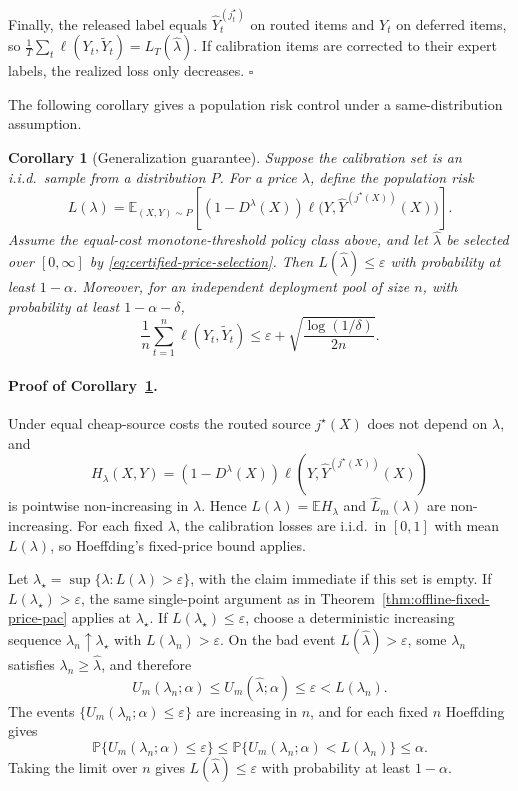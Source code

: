 \documentclass[11pt]{article}
\newtheorem{corollary}{Corollary}
\newcommand{\E}{\mathbb{E}}
\newcommand{\Pp}{\mathbb{P}}
\newcommand{\hatY}{\widehat Y}
\newcommand{\tildeY}{\widetilde Y}
\newcommand{\hatL}{\widehat L}
\newcommand{\eps}{\varepsilon}
\begin{document}
Finally, the released label equals \(\hatY_t^{(j_t^\star)}\) on routed items
and \(Y_t\) on deferred items, so
\(\frac1T\sum_t\ell(Y_t,\tildeY_t)=L_T(\hat\lambda)\). If calibration items are
corrected to their expert labels, the realized loss only decreases. \hfill$\square$

The following corollary gives a population risk control under a same-distribution assumption.

\begin{corollary}[Generalization guarantee]
\label{cor:inductive-deployment}
Suppose the calibration set is an i.i.d.\ sample from a distribution $P$. For a price
$\lambda$, define the population risk
\[
    L(\lambda)
    =
    \E_{(X,Y)\sim P}
    \left[
        (1-D^\lambda(X))
        \ell\bigl(Y,\hatY^{(j^\star(X))}(X)\bigr)
    \right].
\]
Assume the equal-cost monotone-threshold policy class above, and let
\(\hat\lambda\) be selected over \([0,\infty]\) by
\eqref{eq:certified-price-selection}.
Then $L(\hat\lambda)\le\eps$ with probability at least $1-\alpha$.
Moreover, for an independent deployment pool of size \(n\), with probability at
least \(1-\alpha-\delta\),
\begin{equation}
    \frac{1}{n}\sum_{t=1}^{n} \ell(Y_t,\tildeY_t)
    \le
    \eps + \sqrt{\frac{\log(1/\delta)}{2n}}.
    \label{eq:inductive-realized-bound}
\end{equation}
\end{corollary}

\paragraph{Proof of Corollary~\ref{cor:inductive-deployment}.}
Under equal cheap-source costs the routed source \(j^\star(X)\) does not depend
on \(\lambda\), and
\[
    H_\lambda(X,Y)
    =
    (1-D^\lambda(X))\ell(Y,\hatY^{(j^\star(X))}(X))
\]
is pointwise non-increasing in \(\lambda\). Hence \(L(\lambda)=\E H_\lambda\)
and \(\hatL_m(\lambda)\) are non-increasing. For each fixed \(\lambda\), the
calibration losses are i.i.d.\ in \([0,1]\) with mean \(L(\lambda)\), so
Hoeffding's fixed-price bound applies.

Let \(\lambda_\star=\sup\{\lambda:L(\lambda)>\eps\}\), with the claim immediate
if this set is empty. If \(L(\lambda_\star)>\eps\), the same single-point
argument as in Theorem~\ref{thm:offline-fixed-price-pac} applies at
\(\lambda_\star\). If \(L(\lambda_\star)\le\eps\), choose a deterministic
increasing sequence \(\lambda_n\uparrow\lambda_\star\) with
\(L(\lambda_n)>\eps\). On the bad event \(L(\hat\lambda)>\eps\), some
\(\lambda_n\) satisfies \(\lambda_n\ge\hat\lambda\), and therefore
\[
    U_m(\lambda_n;\alpha)
    \le U_m(\hat\lambda;\alpha)
    \le \eps
    <
    L(\lambda_n).
\]
The events \(\{U_m(\lambda_n;\alpha)\le\eps\}\) are increasing in \(n\), and for
each fixed \(n\) Hoeffding gives
\[
    \Pp\{U_m(\lambda_n;\alpha)\le\eps\}
    \le
    \Pp\{U_m(\lambda_n;\alpha)<L(\lambda_n)\}
    \le \alpha .
\]
Taking the limit over \(n\) gives \(L(\hat\lambda)\le\eps\) with probability at
least \(1-\alpha\).
\end{document}
